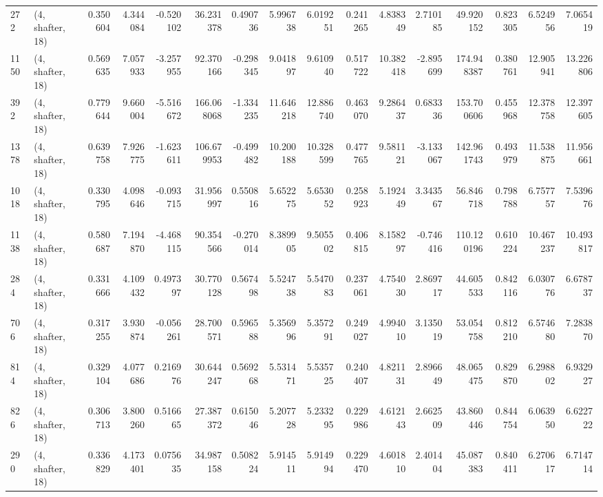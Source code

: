 \begin{tabular}{llrrrrrrrrrrrrrr}
272  &  (4, shafter, 18) &   0.350604 &   4.344084 &  -0.520102 &     36.231378 &    0.490736 &    5.996738 &    6.019251 &  0.241265 &   4.838349 &   2.710185 &    49.920152 &   0.823305 &   6.524956 &   7.065419 \\
1150 &  (4, shafter, 18) &   0.569635 &   7.057933 &  -3.257955 &     92.370166 &   -0.298345 &    9.041897 &    9.610940 &  0.517722 &  10.382418 &  -2.895699 &   174.948387 &   0.380761 &  12.905941 &  13.226806 \\
392  &  (4, shafter, 18) &   0.779644 &   9.660004 &  -5.516672 &    166.068068 &   -1.334235 &   11.646218 &   12.886740 &  0.463070 &   9.286437 &   0.683336 &   153.700606 &   0.455968 &  12.378758 &  12.397605 \\
1378 &  (4, shafter, 18) &   0.639758 &   7.926775 &  -1.623611 &    106.679953 &   -0.499482 &   10.200188 &   10.328599 &  0.477765 &   9.581121 &  -3.133067 &   142.961743 &   0.493979 &  11.538875 &  11.956661 \\
1018 &  (4, shafter, 18) &   0.330795 &   4.098646 &  -0.093715 &     31.956997 &    0.550816 &    5.652275 &    5.653052 &  0.258923 &   5.192449 &   3.343567 &    56.846718 &   0.798788 &   6.757757 &   7.539676 \\
1138 &  (4, shafter, 18) &   0.580687 &   7.194870 &  -4.468115 &     90.354566 &   -0.270014 &    8.389905 &    9.505502 &  0.406815 &   8.158297 &  -0.746416 &   110.120196 &   0.610224 &  10.467237 &  10.493817 \\
284  &  (4, shafter, 18) &   0.331666 &   4.109432 &   0.497397 &     30.770128 &    0.567498 &    5.524738 &    5.547083 &  0.237061 &   4.754030 &   2.869717 &    44.605533 &   0.842116 &   6.030776 &   6.678737 \\
706  &  (4, shafter, 18) &   0.317255 &   3.930874 &  -0.056261 &     28.700571 &    0.596588 &    5.356996 &    5.357291 &  0.249027 &   4.994010 &   3.135019 &    53.054758 &   0.812210 &   6.574680 &   7.283870 \\
814  &  (4, shafter, 18) &   0.329104 &   4.077686 &   0.216976 &     30.644247 &    0.569268 &    5.531471 &    5.535725 &  0.240407 &   4.821131 &   2.896649 &    48.065475 &   0.829870 &   6.298802 &   6.932927 \\
826  &  (4, shafter, 18) &   0.306713 &   3.800260 &   0.516665 &     27.387372 &    0.615046 &    5.207728 &    5.233295 &  0.229986 &   4.612143 &   2.662509 &    43.860446 &   0.844754 &   6.063950 &   6.622722 \\
290  &  (4, shafter, 18) &   0.336829 &   4.173401 &   0.075635 &     34.987158 &    0.508224 &    5.914511 &    5.914994 &  0.229470 &   4.601810 &   2.401404 &    45.087383 &   0.840411 &   6.270617 &   6.714714 \\

\end{tabular}
